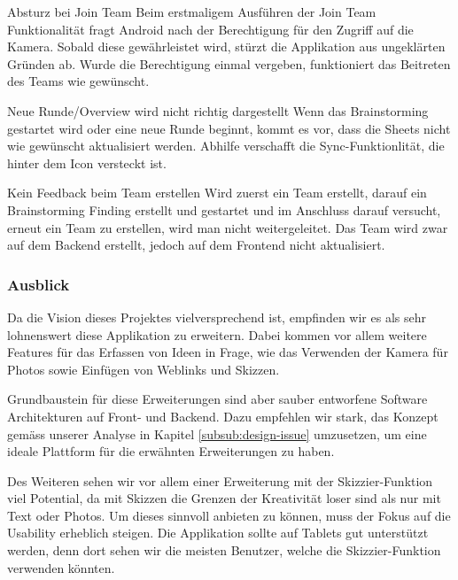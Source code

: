 \begin{basedescript}{
		\desclabelstyle{\multilinelabel}
		\desclabelwidth{4.5cm}
		\setlength{\itemsep}{5ex}}
	\item [Absturz bei Join Team] Beim erstmaligem Ausführen der Join Team Funktionalität fragt Android nach der Berechtigung für den Zugriff auf die Kamera. Sobald diese gewährleistet wird, stürzt die Applikation aus ungeklärten Gründen ab. Wurde die Berechtigung einmal vergeben, funktioniert das Beitreten des Teams wie gewünscht.
	
	\item [Neue Runde/Overview wird nicht richtig dargestellt] 
	Wenn das Brainstorming gestartet wird oder eine neue Runde beginnt, kommt es vor, dass die Sheets nicht wie gewünscht aktualisiert werden. Abhilfe verschafft die Sync-Funktionlität, die hinter dem Icon versteckt ist.
	
	\item [Kein Feedback beim Team erstellen] 
	Wird zuerst ein Team erstellt, darauf ein Brainstorming Finding erstellt und gestartet und im Anschluss darauf versucht, erneut ein Team zu erstellen, wird man nicht weitergeleitet. Das Team wird zwar auf dem Backend erstellt, jedoch auf dem Frontend nicht aktualisiert.
\end{basedescript}


\subsubsection{Ausblick}
\label{subsub:Ausblick}

Da die Vision dieses Projektes vielversprechend ist, empfinden wir es als sehr lohnenswert diese Applikation zu erweitern. Dabei kommen vor allem weitere Features für das Erfassen von Ideen in Frage, wie das Verwenden der Kamera für Photos sowie  Einfügen von Weblinks und Skizzen.

Grundbaustein für diese Erweiterungen sind aber sauber entworfene Software Architekturen auf Front- und Backend. Dazu empfehlen wir stark, das Konzept gemäss unserer Analyse in Kapitel \ref{subsub:design-issue} umzusetzen, um eine ideale Plattform für die erwähnten Erweiterungen zu haben. 

Des Weiteren sehen wir vor allem einer Erweiterung mit der Skizzier-Funktion viel Potential, da mit Skizzen die Grenzen der Kreativität loser sind als nur mit Text oder Photos. Um dieses sinnvoll anbieten zu können, muss der Fokus auf die Usability erheblich steigen. Die Applikation sollte auf Tablets gut unterstützt werden, denn dort sehen wir die meisten Benutzer, welche die Skizzier-Funktion verwenden könnten. 

